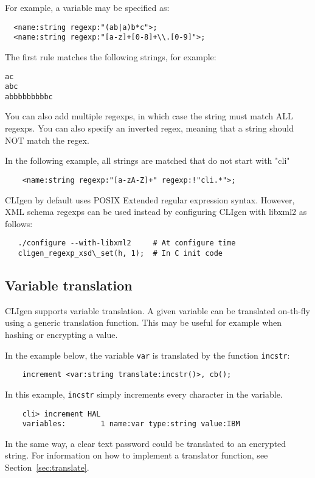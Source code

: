 \documentclass[a4paper, 10pt] {article}
\begin{document}
For example, a variable may be specified as:
\begin{verbatim}
  <name:string regexp:"(ab|a)b*c">;
  <name:string regexp:"[a-z]+[0-8]+\\.[0-9]">;
\end{verbatim}
The first rule matches the following strings, for example:
\begin{verbatim}
ac
abc
abbbbbbbbbc
\end{verbatim}

You can also add multiple regexps, in which case the string must match ALL regexps. You can also specify an inverted regex, meaning that a string should NOT match the regex.

In the following example, all strings are matched that do not start with "cli"
\begin{verbatim}
    <name:string regexp:"[a-zA-Z]+" regexp:!"cli.*">;
\end{verbatim}

CLIgen by default uses POSIX Extended regular expression syntax.
However, XML schema regexps can be used instead by configuring CLIgen with libxml2 as follows:
\begin{verbatim}
   ./configure --with-libxml2     # At configure time
   cligen_regexp_xsd\_set(h, 1);  # In C init code
\end{verbatim}

\subsection{Variable translation}

CLIgen supports variable translation. A given variable can be
translated on-th-fly using a generic translation function. This may be useful for example when hashing or encrypting a value.

In the example below, the variable {\tt var} is translated by the function {\tt incstr}:
\begin{verbatim}
    increment <var:string translate:incstr()>, cb();
\end{verbatim}

In this example, {\tt incstr} simply increments every character in the variable.
\begin{verbatim}
    cli> increment HAL
    variables:        1 name:var type:string value:IBM
\end{verbatim}

In the same way, a clear text password could be translated to an encrypted string.
For information on how to implement a translator function, see Section~\ref{sec:translate}.
\end{document}
